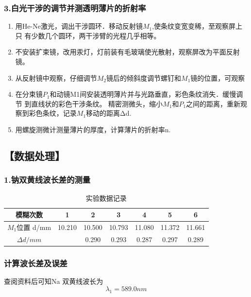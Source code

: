 \documentclass[12pt,a4paper,UTF8]{ctexart}
\begin{document}
\subsubsection*{3.白光干涉的调节并测透明薄片的折射率}
    \begin{enumerate}
		\item 用He-Ne激光，调出干涉圆环．移动反射镜$M_1$,使条纹变宽变稀，至观察屏上只
		有少数几个圆环，两干涉臂的光程几乎相等。
		\item 不安装扩束镜，改用汞灯，灯前装有毛玻璃使光散射，观察屏改为平面反射镜。
		\item 从反射镜中观察，仔细调节$M_2$镜后的倾斜度调节螺钉和$M_1$镜的位置，可观察
		\item 在分束镜$P_1$和动镜M1间安装透明薄片并与光路垂直，彩色条纹消失．缓慢调节
		到直线状的彩色干涉条纹。
		精密测微头，缩小$M_1$和$P_1$之间的距离，重新观察到彩色条纹，记录$M_1$移动的距离Δd.
		\item 用螺旋测微计测量薄片的厚度，计算薄片的折射率n.
	\end{enumerate}

\subsection*{【数据处理】}
\subsubsection*{1.钠双黄线波长差的测量}

\begin{table}[htbp]
	\centering
	\caption{实验数据记录}
	\begin{tabular}{ccccccc}
	\toprule
    模糊次数 & 1 & 2 & 3 & 4 & 5 & 6 \\
	\midrule
    $M_1$位置 d/mm &10.210 & 10.500 & 10.793 & 11.080 & 11.372 &11.661 \\
    $\varDelta d / mm $ & & 0.290 & 0.293 & 0.287 & 0.297 & 0.289 \\
	\bottomrule
	\end{tabular}%
	\label{tab:device}%
\end{table}%

\subsubsection*{计算波长差及误差}

查阅资料后可知Na 双黄线波长为
\begin{equation*}
    \lambda_1=589.0nm
\end{equation*}
\end{document}

